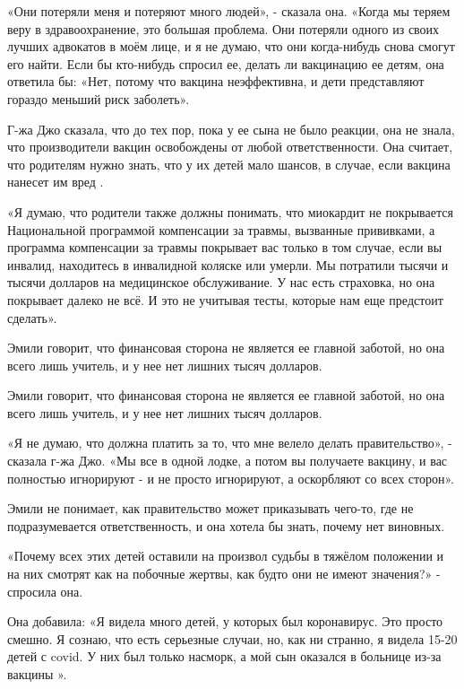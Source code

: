 «Они потеряли меня и потеряют много людей», - сказала она. «Когда мы теряем веру
в здравоохранение, это большая проблема. Они потеряли одного из своих лучших
адвокатов в моём лице, и я не думаю, что они когда-нибудь снова смогут его
найти. Если бы кто-нибудь спросил ее, делать ли вакцинацию ее детям, она
ответила бы: «Нет, потому что вакцина неэффективна, и дети представляют гораздо
меньший риск заболеть».

Г-жа Джо сказала, что до тех пор, пока у ее сына не было реакции, она не знала,
что производители вакцин освобождены от любой ответственности. Она считает, что
родителям нужно знать, что у их детей мало шансов, в случае, если вакцина
нанесет им вред .

«Я думаю, что родители также должны понимать, что миокардит не покрывается
Национальной программой компенсации за травмы, вызванные прививками, а программа
компенсации за травмы покрывает вас только в том случае, если вы инвалид,
находитесь в инвалидной коляске или умерли. Мы потратили тысячи и тысячи
долларов на медицинское обслуживание. У нас есть страховка, но она покрывает
далеко не всё. И это не учитывая тесты, которые нам еще предстоит сделать».

Эмили говорит, что финансовая сторона не является ее главной заботой, но она
всего лишь учитель, и у нее нет лишних тысяч долларов.

Эмили говорит, что финансовая сторона не является ее главной заботой, но она
всего лишь учитель, и у нее нет лишних тысяч долларов.

«Я не думаю, что должна платить за то, что мне велело делать правительство», -
сказала г-жа Джо. «Мы все в одной лодке, а потом вы получаете вакцину, и вас
полностью игнорируют - и не просто игнорируют, а оскорбляют со всех сторон».

Эмили не понимает, как правительство может приказывать чего-то, где не подразумевается ответственность, и она хотела бы знать, почему нет виновных.

«Почему всех этих детей оставили на произвол судьбы в тяжёлом положении и на них
смотрят как на побочные жертвы, как будто они не имеют значения?» - спросила
она.

Она добавила: «Я видела много детей, у которых был коронавирус. Это просто
смешно. Я сознаю, что есть серьезные случаи, но, как ни странно, я видела 15-20
детей с covid. У них был только насморк, а мой сын оказался в больнице из-за
вакцины ».

